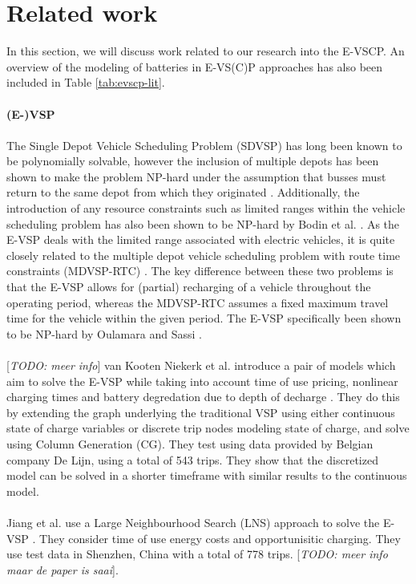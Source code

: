 \documentclass[]{article}
\newcommand{\todo}[1]{{\color{red}[\textit{TODO: #1}]}}
\begin{document}
\section{Related work}
In this section, we will discuss work related to our research into the E-VSCP.  An overview of the modeling of batteries in E-VS(C)P approaches has also been included in Table \ref{tab:evscp-lit}.  \\\\ 
\noindent \textbf{(E-)VSP} \\\\
The Single Depot Vehicle Scheduling Problem (SDVSP) has long been known to be polynomially solvable, however the inclusion of multiple depots has been shown to make the problem NP-hard under the assumption that busses must return to the same depot from which they originated \cite{Bunte2009}. Additionally, the introduction of any resource constraints such as limited ranges within the vehicle scheduling problem has also been shown to be NP-hard by Bodin et al. \cite{BODIN198363}. As the E-VSP deals with the limited range associated with electric vehicles, it is quite closely related to the multiple depot vehicle scheduling problem with route time constraints (MDVSP-RTC) \cite{HAGHANI2002309}. The key difference between these two problems is that the E-VSP allows for (partial) recharging of a vehicle throughout the operating period, whereas the MDVSP-RTC assumes a fixed maximum travel time for the vehicle within the given period. The E-VSP specifically been shown to be NP-hard by Oulamara and Sassi \cite{Sassi2014}. \\\\
\cite{HAGHANI2002309}
\todo{meer info} van Kooten Niekerk et al. introduce a pair of models which aim to solve the E-VSP while taking into account time of use pricing, nonlinear charging times and battery degredation due to depth of decharge \cite{vanKootenNiekerk2017}. They do this by extending the graph underlying the traditional VSP using either continuous state of charge variables or discrete trip nodes modeling state of charge, and solve using Column Generation (CG). They test using data provided by Belgian company De Lijn, using a total of 543 trips. They show that the discretized model can be solved in a shorter timeframe with similar results to the continuous model. \\\\
Jiang et al. use a Large Neighbourhood Search (LNS) approach to solve the E-VSP \cite{Jiang2021}. They consider time of use energy costs and opportunisitic charging. They use test data in Shenzhen, China with a total of 778 trips. \todo{meer info maar de paper is saai}.
\end{document}
